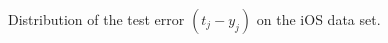 \documentclass[10pt,a4paper,notitlepage,twocolumn]{article}
\begin{document}
\begin{figure}[!h]
\caption{Distribution of the test error $(t_j-y_j)$ on the iOS data set.}
\label{fig:ios_dist}
\end{figure}
\end{document}
